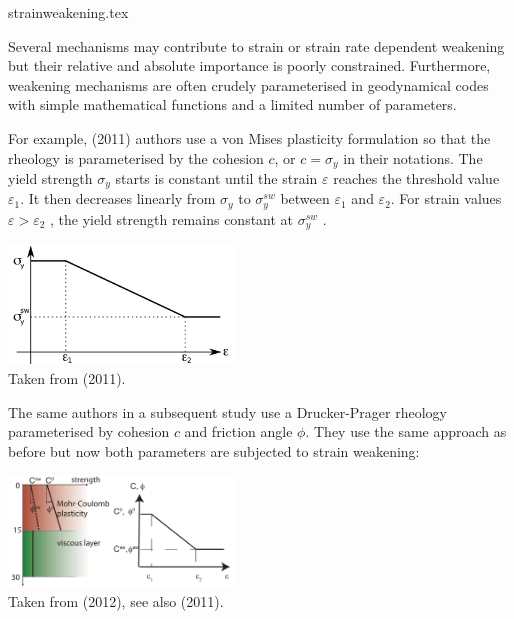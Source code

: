 \begin{flushright} {\tiny {\color{gray} strainweakening.tex}} \end{flushright}

Several mechanisms may contribute to strain or strain
rate dependent weakening but their relative and absolute
importance is poorly constrained. Furthermore, 
weakening mechanisms are often crudely parameterised in 
geodynamical codes with simple mathematical functions 
and a limited number of parameters. 

For example, \textcite{alht11} (2011) authors use a von Mises plasticity formulation so that the 
rheology is parameterised by the cohesion $c$, or $c=\sigma_y$ in their notations. The
yield strength $\sigma_y$ starts is constant until the strain
$\varepsilon$ reaches the threshold value $\varepsilon_1$. It then decreases linearly
from $\sigma_y$ to $\sigma_{y}^{sw}$ between $\varepsilon_1$ and $\varepsilon_2$. 
For strain values $\varepsilon>\varepsilon_2$ , the yield strength remains constant 
at $\sigma_y^{sw}$ .

\begin{center}
\includegraphics[width=6cm]{images/strainweakening/alht11}\\
{\captionfont Taken from \textcite{alht11} (2011).}
\end{center}

The same authors in a subsequent study use a Drucker-Prager rheology parameterised by 
cohesion $c$ and friction angle $\phi$. They use the same approach as before but now 
both parameters are subjected to strain weakening: 

\begin{center}
\includegraphics[width=6cm]{images/strainweakening/alht12}\\
{\captionfont Taken from \textcite{alht12} (2012), see also \textcite{thie11} (2011).}
\end{center}

